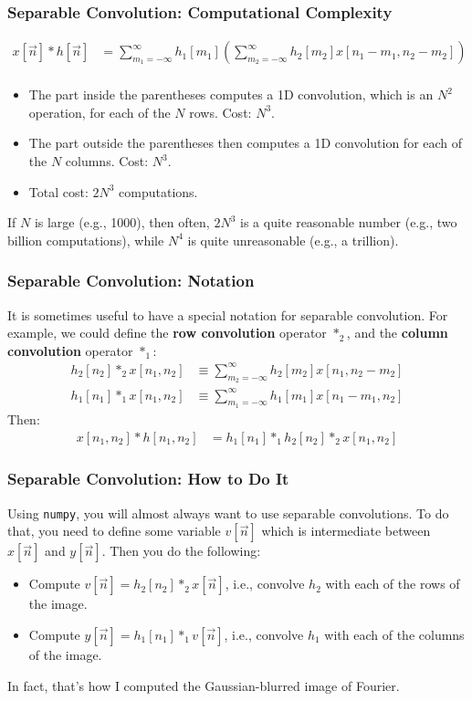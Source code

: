 \documentclass{beamer}
\begin{document}
\begin{frame}
  \frametitle{Separable Convolution: Computational Complexity}
  
  \begin{align*}
    x[\vec{n}]\ast h[\vec{n}] &=
    \sum_{m_1=-\infty}^\infty h_1[m_1]\left(\sum_{m_2=-\infty}^\infty h_2[m_2]x[n_1-m_1,n_2-m_2]\right)\\
  \end{align*}
  
  \begin{itemize}
    \item The part inside the parentheses computes a 1D convolution,
      which is an $N^2$ operation, for each of the $N$ rows.  Cost:
      $N^3$.
    \item The part outside the parentheses then computes a 1D
      convolution for each of the $N$ columns.  Cost: $N^3$.
    \item Total cost: $2N^3$ computations.
  \end{itemize}
  If $N$ is large (e.g., 1000), then often, $2N^3$ is a quite
  reasonable number (e.g., two billion computations), while $N^4$ is
  quite unreasonable (e.g., a trillion).
\end{frame}

\begin{frame}
  \frametitle{Separable Convolution: Notation}

  It is sometimes useful to have a special notation for separable
  convolution.  For example, we could define the {\bf row convolution}
  operator $\ast_2$, and the {\bf column convolution} operator $\ast_1$:
  \begin{align*}
    h_2[n_2] \ast_2 x[n_1,n_2] &\equiv \sum_{m_2=-\infty}^\infty h_2[m_2]x[n_1, n_2-m_2]\\
    h_1[n_1] \ast_1 x[n_1,n_2] &\equiv \sum_{m_1=-\infty}^\infty h_1[m_1]x[n_1-m_1, n_2]
  \end{align*}
  Then:
  \begin{align*}
    x[n_1,n_2]\ast h[n_1,n_2]
    &= h_1[n_1] \ast_1 h_2[n_2]\ast_2 x[n_1,n_2]
  \end{align*}
  
\end{frame}

\begin{frame}
  \frametitle{Separable Convolution: How to Do It}

  Using \texttt{numpy}, you will almost always want to use separable
  convolutions.  To do that, you need to define some variable
  $v[\vec{n}]$ which is intermediate between $x[\vec{n}]$ and
  $y[\vec{n}]$.  Then you do the following:
  \begin{itemize}
  \item Compute $v[\vec{n}]=h_2[n_2]\ast_2 x[\vec{n}]$, i.e., convolve
    $h_2$ with each of the rows of the image.
  \item Compute $y[\vec{n}]=h_1[n_1]\ast_1 v[\vec{n}]$, i.e., convolve
    $h_1$ with each of the columns of the image.
  \end{itemize}
  In fact, that's how I computed the Gaussian-blurred image of Fourier.
\end{frame}
\end{document}
